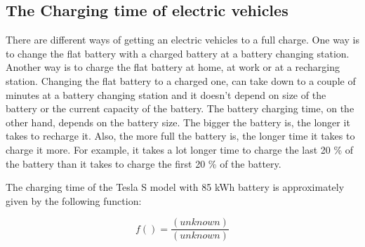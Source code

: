 \subsection{The Charging time of electric vehicles}
  
There are different ways of getting an electric vehicles to a full charge. One way is to change the
flat battery with a charged battery at a battery changing station.  Another way is to charge the flat 
battery at home, at work or at a recharging station. Changing the flat battery to a charged one, can 
take down to a couple of minutes at a battery changing station and it doesn't depend on size of the battery 
or the current capacity of the battery. The battery charging time, on the other hand, depends on the battery 
size. The bigger the battery is, the longer it takes to recharge it. Also, the more full the battery is, the 
longer time it takes to charge it more. For example, it takes a lot longer time to charge the last 20 \% of 
the battery than it takes to charge the first 20 \% of the battery.

The charging time of the Tesla S model with 85 kWh battery is approximately given by the following function:

\[f() = \frac{(\textit{unknown})}{(\textit{unknown})}\]




